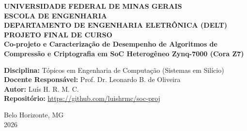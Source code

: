 \documentclass[11pt,a4paper]{article}
\begin{document}
\begin{titlepage}
  \centering
  \vspace*{1.0cm}
  {\Large \textbf{UNIVERSIDADE FEDERAL DE MINAS GERAIS}}\\[0.2cm]
  {\large \textbf{ESCOLA DE ENGENHARIA}}\\[0.2cm]
  {\large \textbf{DEPARTAMENTO DE ENGENHARIA ELETRÔNICA (DELT)}}\\[2.5cm]

  {\LARGE \textbf{PROJETO FINAL DE CURSO}}\\[0.6cm]
  {\huge \bfseries Co-projeto e Caracterização de Desempenho de Algoritmos de Compressão e Criptografia em SoC Heterogêneo Zynq-7000 (Cora Z7)}\\[2.0cm]

  \begin{minipage}{0.85\textwidth}
    \large
    \textbf{Disciplina:} Tópicos em Engenharia de Computação (Sistemas em Silício)\\[0.2cm]
    \textbf{Docente Responsável:} Prof. Dr. Leonardo B. de Oliveira\\[0.2cm]
    \textbf{Autor:} Luís H. R. M. C.\\[0.2cm]
    \textbf{Repositório:} \href{https://github.com/luishrmc/soc-proj}{https://github.com/luishrmc/soc-proj}
  \end{minipage}

  \vfill
  {\large Belo Horizonte, MG}\\[0.2cm]
  {\large 2026}
\end{titlepage}
\end{document}
